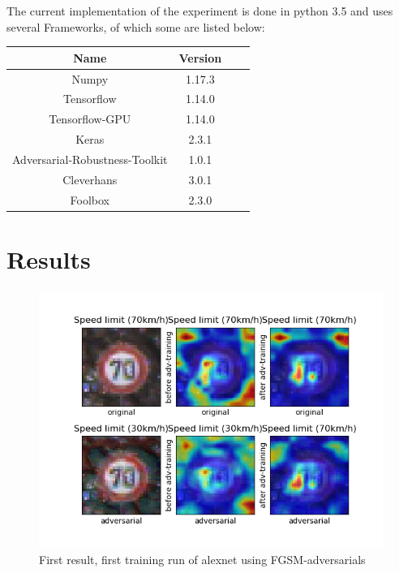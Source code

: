 \documentclass[draft,final]{vutinfth} %
\begin{document}
The current implementation of the experiment is done in python 3.5 and uses several Frameworks, of which some are listed below:

\begin{table}[h]
  \centering
  \begin{tabular}{cccc}
    \toprule
Name                                    & Version   \\
    \midrule
    Numpy                               & 1.17.3    \\
    Tensorflow                          & 1.14.0    \\
    Tensorflow-GPU                      & 1.14.0    \\
    Keras                               & 2.3.1     \\
    Adversarial-Robustness-Toolkit      & 1.0.1     \\
    Cleverhans                          & 3.0.1     \\
    Foolbox                             & 2.3.0     \\
    
    \bottomrule
  \end{tabular}
\end{table}

\chapter{Results}

\begin{figure}[h]
    \centering
    \includegraphics[scale=0.5]{graphics/Results/3.png}
    \caption{First result, first training run of alexnet using FGSM-adversarials}
    \label{fig:results} %
\end{figure}
\end{document}
